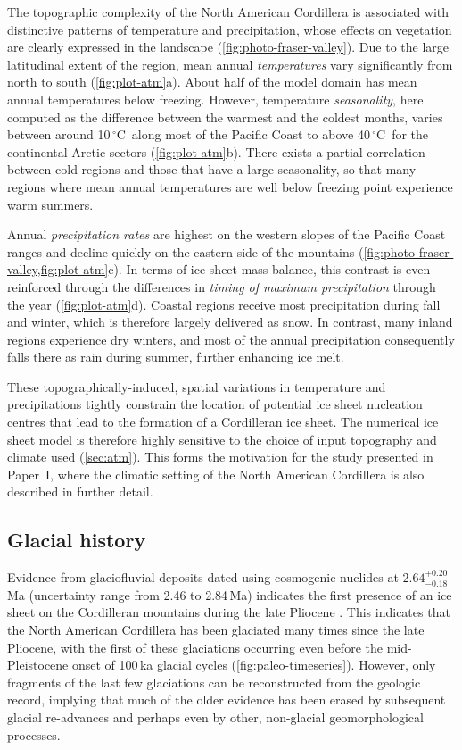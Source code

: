\documentclass[a4paper]{kappa}
\newcommand{\unit}[1]{\ensuremath{\mathrm{#1}}}
\newcommand{\degree}[0]{\ensuremath{^{\circ}}}
\newcommand{\degC}[0]{\unit{{\degree}C}}
\newcommand{\CCLI}[0]{Paper~I}      %
\begin{document}
The topographic complexity of the North American Cordillera is associated with
distinctive patterns of temperature and precipitation, whose effects on
vegetation are clearly expressed in the landscape
(\cref{fig:photo-fraser-valley}). Due to the large latitudinal extent of the
region, mean annual \emph{temperatures} vary significantly from north to south
(\cref{fig:plot-atm}a). About half of the model domain has mean annual
temperatures below freezing. However, temperature \emph{seasonality},
here computed as the difference between the warmest and the coldest months,
varies between around 10\,\degC\ along most of the Pacific Coast to above
40\,\degC\ for the continental Arctic sectors
(\cref{fig:plot-atm}b). There exists a
partial correlation between cold regions and those that have a large
seasonality, so that many regions where mean annual temperatures are well below
freezing point experience warm summers.

Annual \emph{precipitation rates} are highest on the western slopes of the
Pacific Coast ranges and decline quickly on the eastern side of the mountains
(\cref{fig:photo-fraser-valley,fig:plot-atm}c). In terms of ice sheet
mass balance, this contrast is even reinforced through the differences in
\emph{timing of maximum precipitation} through the year (\cref{fig:plot-atm}d).
Coastal regions receive most precipitation during fall and winter, which is
therefore largely delivered as snow. In contrast, many inland regions
experience dry winters, and most of the annual precipitation consequently
falls there as rain during summer, further enhancing ice melt.

These topographically-induced, spatial variations in temperature and
precipitations tightly constrain the location of potential ice sheet nucleation
centres that lead to the formation of a Cordilleran ice sheet. The numerical
ice sheet model is therefore highly sensitive to the choice of input topography
and climate used (\cref{sec:atm}). This forms the motivation for the study
presented in \CCLI, where the climatic setting of the North American Cordillera
is also described in further detail.

\subsection{Glacial history}

Evidence from glaciofluvial deposits dated using cosmogenic nuclides at
$2.64^{+0.20}_{-0.18}$\,Ma (uncertainty range from 2.46 to 2.84\,Ma)
indicates the first presence of an ice sheet on the
Cordilleran mountains during the late Pliocene \citep{Hidy.etal.2013}.
This indicates that the North American Cordillera has been glaciated many times
since the late Pliocene, with the first of these glaciations occurring even
before the mid-Pleistocene onset of 100\,ka glacial cycles
(\cref{fig:paleo-timeseries}). However, only fragments of the last few
glaciations can be reconstructed from the geologic record, implying that much
of the older evidence has been erased by subsequent glacial re-advances and
perhaps even by other, non-glacial geomorphological processes.
\end{document}

